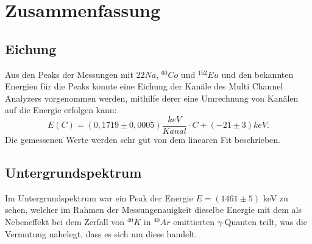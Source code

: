 \clearpage
\section{Zusammenfassung}
\subsection{Eichung}
Aus den Peaks der Messungen mit ${22}Na$, $^{60}Co$ und $^{152}Eu$ und den bekannten Energien für die Peaks konnte eine Eichung der Kanäle des Multi Channel Analyzers vorgenommen werden, mithilfe derer eine Umrechnung von Kanälen auf die Energie erfolgen kann: 
\[E(C)=(0,1719\pm0,0005)\frac{keV}{Kanal}\cdot C+(-21\pm3)keV.\]
Die gemessenen Werte werden sehr gut von dem linearen Fit beschrieben.
\subsection{Untergrundspektrum}
Im Untergrundspektrum war ein Peak der Energie $E=(1461\pm5)$ keV zu sehen, welcher im Rahmen der Messungenauigkeit dieselbe Energie mit dem als Nebeneffekt bei dem Zerfall von $^{40}K$ in $^{40}Ar$ emittierten $\gamma$-Quanten teilt, was die Vermutung nahelegt, dass es sich um diese handelt.
